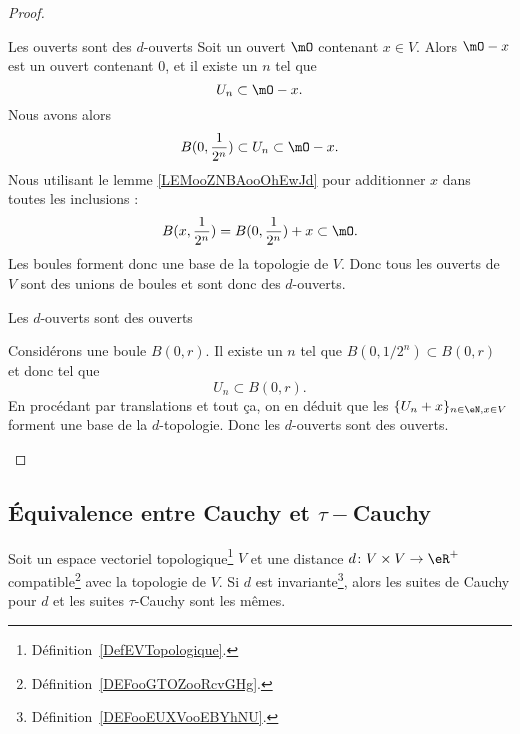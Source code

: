 \begin{proof}
\begin{subproof}
        \begin{subproof}
        \item[Les ouverts sont des \( d\)-ouverts]
            Soit un ouvert \( \mO\) contenant \( x\in V\). Alors \( \mO-x\) est un ouvert contenant \( 0\), et il existe un \( n\) tel que
            \begin{equation}
                U_n\subset \mO-x.
            \end{equation}
            Nous avons alors
            \begin{equation}
                B(0,\frac{1}{ 2^n })\subset U_n\subset \mO-x.
            \end{equation}
            Nous utilisant le lemme \ref{LEMooZNBAooOhEwJd} pour additionner \( x\) dans toutes les inclusions :
            \begin{equation}
                B(x,\frac{1}{ 2^n })=B(0,\frac{1}{ 2^n })+x\subset\mO.
            \end{equation}
            Les boules forment donc une base de la topologie de \( V\). Donc tous les ouverts de \( V\) sont des unions de boules et sont donc des \( d\)-ouverts.
        \item[Les \( d\)-ouverts sont des ouverts]

            Considérons une boule \( B(0,r)\). Il existe un \( n\) tel que \( B(0,1/2^n)\subset B(0,r)\) et donc tel que
            \begin{equation}
                U_n\subset B(0,r).
            \end{equation}
            En procédant par translations et tout ça, on en déduit que les \( \{ U_n+x \}_{n\in \eN, x\in V}\) forment une base de la \( d\)-topologie. Donc les \( d\)-ouverts sont des ouverts.
        \end{subproof}
    \end{subproof}
\end{proof}

\subsection{Équivalence entre Cauchy et \texorpdfstring{$\tau-$}{tau-}Cauchy}

\begin{lemma}       \label{LEMooIAHSooFkXjvr}
    Soit un espace vectoriel topologique\footnote{Définition~\ref{DefEVTopologique}.} \( V\) et une distance \( d\colon V\times V\to \eR^+\) compatible\footnote{Définition~\ref{DEFooGTOZooRcvGHg}.} avec la topologie de \( V\). Si \( d\) est invariante\footnote{Définition~\ref{DEFooEUXVooEBYhNU}.}, alors les suites de Cauchy pour \( d \) et les suites \( \tau\)-Cauchy sont les mêmes.
\end{lemma}

